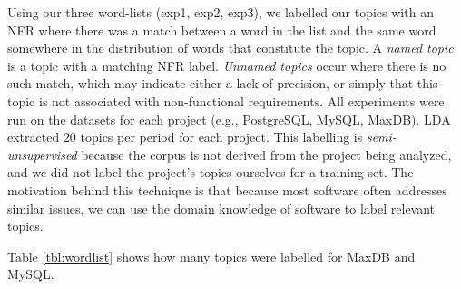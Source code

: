 \documentclass[smallextended]{svjour3}       %
\begin{document}
Using our three word-lists (\textsf{exp1}, \textsf{exp2}, \textsf{exp3}), we labelled our topics with an NFR where there was a match between a word in
the list and the same word somewhere in the distribution of words that constitute the topic.
A \emph{named topic} is a topic with a matching NFR label. \emph{Unnamed
topics} occur where there is no such match, which may indicate either a lack of precision, or simply that this topic is not associated with non-functional
requirements.
All experiments were run on the datasets for each project (e.g., PostgreSQL, MySQL, MaxDB). LDA
extracted $20$ topics per period for each project.
This labelling is \emph{semi-unsupervised} because the corpus is not derived from 
the project being analyzed, and we did not label the project's topics
ourselves for a training set. The motivation behind this technique is that
because most software often addresses similar issues, we can use the 
domain knowledge of software to label relevant topics.

Table \ref{tbl:wordlist} shows how many topics were labelled for MaxDB
and MySQL.
\end{document}
